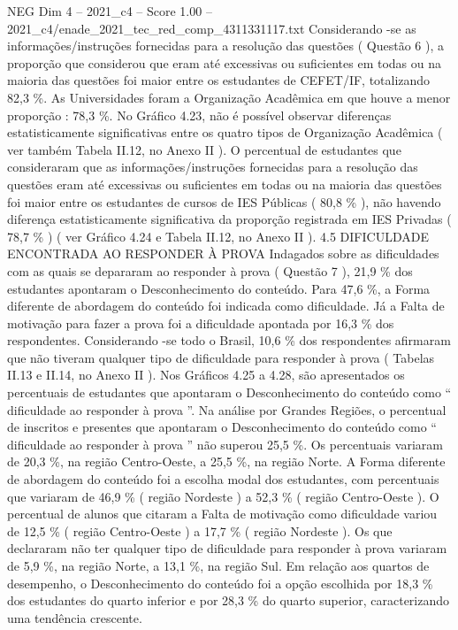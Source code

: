\begin{textsample}{NEG Dim 4 – 2021\_c4 – Score 1.00 – 2021\_c4/enade\_2021\_tec\_red\_comp\_4311331117.txt}
Considerando -se as informações/instruções fornecidas para a resolução das questões ( Questão 6 ), a proporção que considerou que eram até excessivas ou suficientes em todas ou na maioria das questões foi maior entre os estudantes de CEFET/IF, totalizando 82,3 \%.
As Universidades foram a Organização Acadêmica em que houve a menor proporção : 78,3 \%.
No Gráfico 4.23, não é possível observar diferenças estatisticamente significativas entre os quatro tipos de Organização Acadêmica ( ver também Tabela II.12, no Anexo II ).
O percentual de estudantes que consideraram que as informações/instruções fornecidas para a resolução das questões eram até excessivas ou suficientes em todas ou na maioria das questões foi maior entre os estudantes de cursos de IES Públicas ( 80,8 \% ), não havendo diferença estatisticamente significativa da proporção registrada em IES Privadas ( 78,7 \% ) ( ver Gráfico 4.24 e Tabela II.12, no Anexo II ). 4.5 DIFICULDADE ENCONTRADA AO RESPONDER À PROVA Indagados sobre as dificuldades com as quais se depararam ao responder à prova ( Questão 7 ), 21,9 \% dos estudantes apontaram o Desconhecimento do conteúdo.
Para 47,6 \%, a Forma diferente de abordagem do conteúdo foi indicada como dificuldade.
Já a Falta de motivação para fazer a prova foi a dificuldade apontada por 16,3 \% dos respondentes.
Considerando -se todo o Brasil, 10,6 \% dos respondentes afirmaram que não tiveram qualquer tipo de dificuldade para responder à prova ( Tabelas II.13 e II.14, no Anexo II ).
Nos Gráficos 4.25 a 4.28, são apresentados os percentuais de estudantes que apontaram o Desconhecimento do conteúdo como “ dificuldade ao responder à prova ”.
Na análise por Grandes Regiões, o percentual de inscritos e presentes que apontaram o Desconhecimento do conteúdo como “ dificuldade ao responder à prova ” não superou 25,5 \%.
Os percentuais variaram de 20,3 \%, na região Centro-Oeste, a 25,5 \%, na região Norte.
A Forma diferente de abordagem do conteúdo foi a escolha modal dos estudantes, com percentuais que variaram de 46,9 \% ( região Nordeste ) a 52,3 \% ( região Centro-Oeste ).
O percentual de alunos que citaram a Falta de motivação como dificuldade variou de 12,5 \% ( região Centro-Oeste ) a 17,7 \% ( região Nordeste ).
Os que declararam não ter qualquer tipo de dificuldade para responder à prova variaram de 5,9 \%, na região Norte, a 13,1 \%, na região Sul.
Em relação aos quartos de desempenho, o Desconhecimento do conteúdo foi a opção escolhida por 18,3 \% dos estudantes do quarto inferior e por 28,3 \% do quarto superior, caracterizando uma tendência crescente.

\end{textsample}

